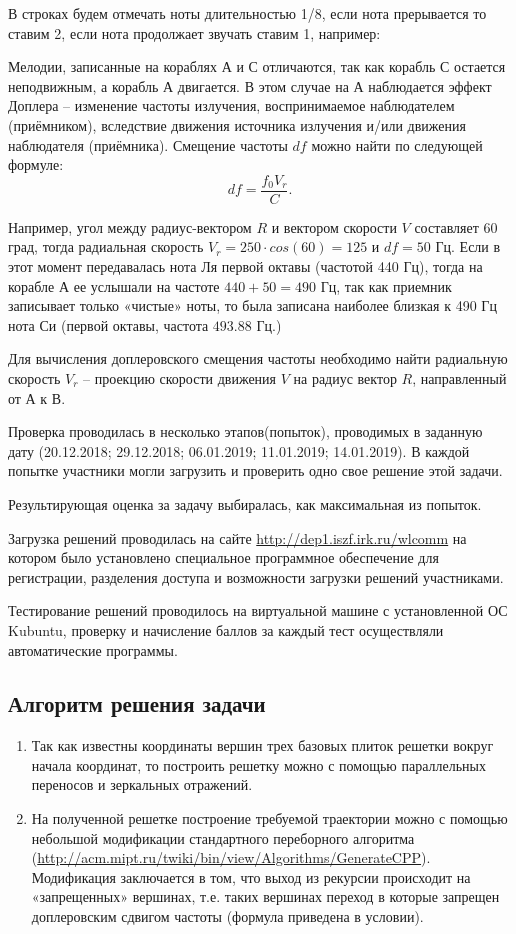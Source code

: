 В строках будем отмечать ноты длительностью 1/8, если нота прерывается то ставим 2, если нота продолжает звучать ставим 1, например:


Мелодии, записанные на кораблях А и С отличаются, так как корабль С остается неподвижным, а корабль А двигается. В этом случае на А наблюдается эффект Доплера – изменение частоты излучения, воспринимаемое наблюдателем (приёмником), вследствие движения источника излучения и/или движения наблюдателя (приёмника). Смещение частоты $df$ можно найти по следующей формуле:
$$df=\frac{f_0 V_r}{C}.$$

Например, угол между радиус-вектором $R$ и вектором скорости $V$ составляет 60 град, тогда радиальная скорость $V_r = 250 \cdot cos(60) = 125$ и $df = 50$ Гц. Если в этот момент передавалась нота Ля первой октавы (частотой 440 Гц), тогда на корабле А ее услышали на частоте $440+50=490$ Гц, так как приемник записывает только «чистые» ноты, то была записана наиболее близкая к 490 Гц нота Си (первой октавы, частота $493.88$ Гц.)


Для вычисления доплеровского смещения частоты необходимо найти радиальную скорость $V_r$ – проекцию скорости движения $V$ на радиус вектор $R$, направленный от А к В.

Проверка проводилась в несколько этапов(попыток), проводимых в заданную дату (20.12.2018; 29.12.2018; 06.01.2019; 11.01.2019; 14.01.2019). В каждой попытке участники могли загрузить и проверить одно свое решение этой задачи.

Результирующая оценка за задачу выбиралась, как максимальная из попыток.

Загрузка решений проводилась на сайте \url{http://dep1.iszf.irk.ru/wlcomm} на котором было установлено специальное программное обеспечение для регистрации, разделения доступа и возможности загрузки решений участниками.

Тестирование решений проводилось на виртуальной машине с установленной ОС Kubuntu, проверку и начисление баллов за каждый тест осуществляли автоматические программы.

\subsection*{Алгоритм решения задачи}

\begin{enumerate}
    \item Так как известны координаты вершин трех базовых плиток решетки вокруг начала координат, то построить решетку можно с помощью параллельных переносов и зеркальных отражений.
    \item На полученной решетке построение требуемой траектории можно с помощью небольшой модификации стандартного переборного алгоритма (\url{http://acm.mipt.ru/twiki/bin/view/Algorithms/GenerateCPP}). Модификация заключается в том, что выход из рекурсии происходит на «запрещенных» вершинах, т.е. таких вершинах переход в которые запрещен доплеровским сдвигом частоты (формула приведена в условии).
\end{enumerate}